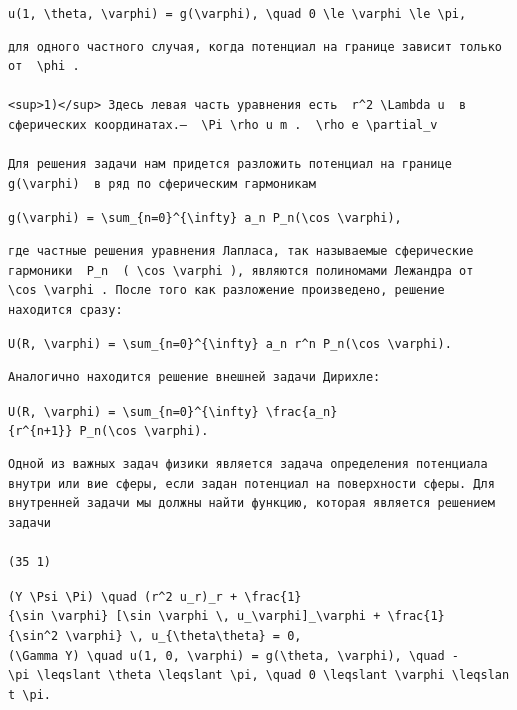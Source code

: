 \documentclass[
  ukrainian,
]{article}
\begin{document}
\texttt{u(1,\ \textbackslash{}theta,\ \textbackslash{}varphi)\ =\ g(\textbackslash{}varphi),\ \textbackslash{}quad\ 0\ \textbackslash{}le\ \textbackslash{}varphi\ \textbackslash{}le\ \textbackslash{}pi,}

\begin{verbatim}
для одного частного случая, когда потенциал на границе зависит только от  \phi .

<sup>1)</sup> Здесь левая часть уравнения есть  r^2 \Lambda u  в сферических координатах.—  \Pi \rho u m .  \rho e \partial_v 

Для решения задачи нам придется разложить потенциал на границе  g(\varphi)  в ряд по сферическим гармоникам
\end{verbatim}

\texttt{g(\textbackslash{}varphi)\ =\ \textbackslash{}sum\_\{n=0\}\^{}\{\textbackslash{}infty\}\ a\_n\ P\_n(\textbackslash{}cos\ \textbackslash{}varphi),}

\begin{verbatim}
где частные решения уравнения Лапласа, так называемые сферические гармоники  P_n  ( \cos \varphi ), являются полиномами Лежандра от  \cos \varphi . После того как разложение произведено, решение находится сразу:
\end{verbatim}

\texttt{U(R,\ \textbackslash{}varphi)\ =\ \textbackslash{}sum\_\{n=0\}\^{}\{\textbackslash{}infty\}\ a\_n\ r\^{}n\ P\_n(\textbackslash{}cos\ \textbackslash{}varphi).}

\begin{verbatim}
Аналогично находится решение внешней задачи Дирихле:
\end{verbatim}

\texttt{U(R,\ \textbackslash{}varphi)\ =\ \textbackslash{}sum\_\{n=0\}\^{}\{\textbackslash{}infty\}\ \textbackslash{}frac\{a\_n\}\{r\^{}\{n+1\}\}\ P\_n(\textbackslash{}cos\ \textbackslash{}varphi).}

\begin{verbatim}
Одной из важных задач физики является задача определения потенциала внутри или вие сферы, если задан потенциал на поверхности сферы. Для внутренней задачи мы должны найти функцию, которая является решением задачи

(35 1)
\end{verbatim}

\texttt{(Y\ \textbackslash{}Psi\ \textbackslash{}Pi)\ \textbackslash{}quad\ (r\^{}2\ u\_r)\_r\ +\ \textbackslash{}frac\{1\}\{\textbackslash{}sin\ \textbackslash{}varphi\}\ {[}\textbackslash{}sin\ \textbackslash{}varphi\ \textbackslash{},\ u\_\textbackslash{}varphi{]}\_\textbackslash{}varphi\ +\ \textbackslash{}frac\{1\}\{\textbackslash{}sin\^{}2\ \textbackslash{}varphi\}\ \textbackslash{},\ u\_\{\textbackslash{}theta\textbackslash{}theta\}\ =\ 0,}
\texttt{(\textbackslash{}Gamma\ Y)\ \textbackslash{}quad\ u(1,\ 0,\ \textbackslash{}varphi)\ =\ g(\textbackslash{}theta,\ \textbackslash{}varphi),\ \textbackslash{}quad\ -\textbackslash{}pi\ \textbackslash{}leqslant\ \textbackslash{}theta\ \textbackslash{}leqslant\ \textbackslash{}pi,\ \textbackslash{}quad\ 0\ \textbackslash{}leqslant\ \textbackslash{}varphi\ \textbackslash{}leqslant\ \textbackslash{}pi.}
\end{document}
